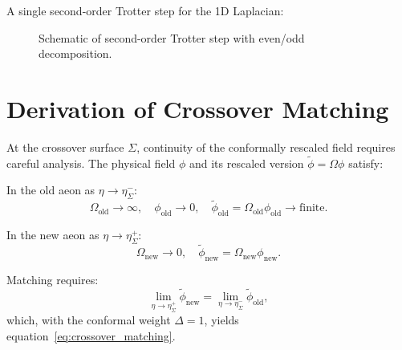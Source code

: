 \documentclass[11pt,a4paper]{article}
\theoremstyle{plain}
\theoremstyle{definition}
\theoremstyle{remark}
\begin{document}
A single second-order Trotter step for the 1D Laplacian:

\begin{figure}[h]
\centering
{}
\caption{Schematic of second-order Trotter step with even/odd decomposition.}
\label{fig:trotter_step}
\end{figure}

\section{Derivation of Crossover Matching}\label{app:crossover}

At the crossover surface $\Sigma$, continuity of the conformally rescaled field requires careful analysis. The physical field $\phi$ and its rescaled version $\tilde{\phi} = \Omega\phi$ satisfy:

In the old aeon as $\eta \to \eta_\Sigma^-$:
\begin{equation}
    \Omega_{\text{old}} \to \infty, \quad \phi_{\text{old}} \to 0, \quad \tilde{\phi}_{\text{old}} = \Omega_{\text{old}}\phi_{\text{old}} \to \text{finite}.
\end{equation}

In the new aeon as $\eta \to \eta_\Sigma^+$:
\begin{equation}
    \Omega_{\text{new}} \to 0, \quad \tilde{\phi}_{\text{new}} = \Omega_{\text{new}}\phi_{\text{new}}.
\end{equation}

Matching requires:
\begin{equation}
    \lim_{\eta \to \eta_\Sigma^+} \tilde{\phi}_{\text{new}} = \lim_{\eta \to \eta_\Sigma^-} \tilde{\phi}_{\text{old}},
\end{equation}
which, with the conformal weight $\Delta = 1$, yields equation~\eqref{eq:crossover_matching}.
\end{document}
